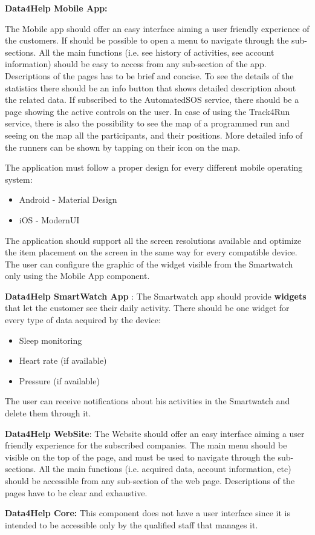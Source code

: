 \textbf{Data4Help Mobile App:}

The Mobile app should offer an easy interface aiming a user friendly experience of the customers. If should be possible to open a menu to navigate through the sub-sections. All the main functions (i.e. see history of activities, see account information) should be easy to access from any sub-section of the app. 
Descriptions of the pages has to be brief and concise.
To see the details of the statistics there should be an info button that shows detailed description about the related data.
If subscribed to the AutomatedSOS service, there should be a page showing the active controls on the user.
In case of using the Track4Run service, there is also the possibility to see the map of a programmed run and seeing on the map all the participants, and their positions. More detailed info of the runners can be shown by tapping on their icon on the map.

The application must follow a proper design for every different mobile operating system:
\begin{itemize}
    \item Android - \vspace{0.3cm} Material Design
    \item iOS - \vspace{0.3cm} ModernUI
\end{itemize}
The application should support all the screen resolutions available and optimize the item placement on the screen in the same way for every compatible device.
\newline
The user can configure the graphic of the widget visible from the Smartwatch only using the Mobile App component.



\textbf{Data4Help SmartWatch App} :
The Smartwatch app should provide \textbf{widgets} that let the customer see their daily activity.
There should be one widget for every type of data acquired by the device:
\begin{itemize}
    \item Sleep monitoring 
    \item Heart rate (if available)
    \item Pressure (if available)
\end{itemize}
The user can receive notifications about his activities in the Smartwatch and delete them through it.
\newline

\textbf{Data4Help WebSite}: The Website should offer an easy interface aiming a user friendly experience for the subscribed companies. The main menu should be visible on the top of the page, and must be used to navigate through the sub-sections. All the main functions (i.e. acquired data, account information, etc) should be accessible from any sub-section of the web page. 
Descriptions of the pages have to be clear and exhaustive.
\newline

\textbf{Data4Help Core:} This component does not have a user interface since it is intended to be accessible only by the qualified staff that manages it. 